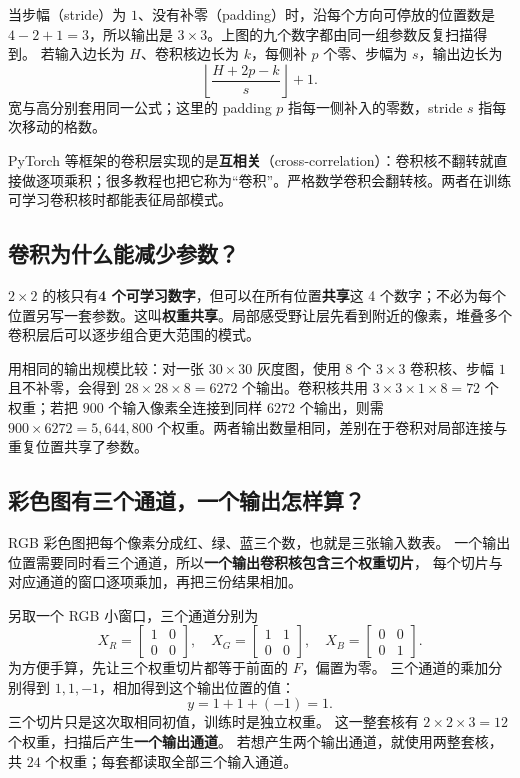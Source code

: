 

当步幅（stride）为 $1$、没有补零（padding）时，沿每个方向可停放的位置数是 $4-2+1=3$，所以输出是 $3\times3$。上图的九个数字都由同一组参数反复扫描得到。
若输入边长为 $H$、卷积核边长为 $k$，每侧补 $p$ 个零、步幅为 $s$，输出边长为
\[
\left\lfloor\frac{H+2p-k}{s}\right\rfloor+1.
\]
宽与高分别套用同一公式；这里的 padding $p$ 指每一侧补入的零数，stride $s$ 指每次移动的格数。

\begin{warningbox}
\label{concept:cross-correlation}PyTorch 等框架的卷积层实现的是\textbf{互相关}（cross-correlation）：卷积核不翻转就直接做逐项乘积；很多教程也把它称为“卷积”。严格数学卷积会翻转核。两者在训练可学习卷积核时都能表征局部模式。
\end{warningbox}

\subsection{卷积为什么能减少参数？}

$2\times2$ 的核只有\textbf{4 个可学习数字}，但可以在所有位置\textbf{共享}这 4 个数字；不必为每个位置另写一套参数。这叫\textbf{权重共享}。局部感受野让层先看到附近的像素，堆叠多个卷积层后可以逐步组合更大范围的模式。

用相同的输出规模比较：对一张 $30\times30$ 灰度图，使用 $8$ 个 $3\times3$ 卷积核、步幅 $1$ 且不补零，会得到 $28\times28\times8=6272$ 个输出。卷积核共用 $3\times3\times1\times8=72$ 个权重；若把 $900$ 个输入像素全连接到同样 $6272$ 个输出，则需 $900\times6272=5{,}644{,}800$ 个权重。两者输出数量相同，差别在于卷积对局部连接与重复位置共享了参数。

\subsection{彩色图有三个通道，一个输出怎样算？}
\label{sec:cnn-channel-sum}

RGB 彩色图把每个像素分成红、绿、蓝三个数，也就是三张输入数表。
一个输出位置需要同时看三个通道，所以\textbf{一个输出卷积核包含三个权重切片}，
每个切片与对应通道的窗口逐项乘加，再把三份结果相加。

另取一个 RGB 小窗口，三个通道分别为
\[
X_R=\begin{bmatrix}1&0\\0&0\end{bmatrix},\quad
X_G=\begin{bmatrix}1&1\\0&0\end{bmatrix},\quad
X_B=\begin{bmatrix}0&0\\0&1\end{bmatrix}.
\]
为方便手算，先让三个权重切片都等于前面的 $F$，偏置为零。
三个通道的乘加分别得到 $1,1,-1$，相加得到这个输出位置的值：
\[
y=1+1+(-1)=\boxed{1}.
\]
三个切片只是这次取相同初值，训练时是独立权重。
这一整套核有 $2\times2\times3=12$ 个权重，扫描后产生\textbf{一个输出通道}。
若想产生两个输出通道，就使用两整套核，共 $24$ 个权重；每套都读取全部三个输入通道。

